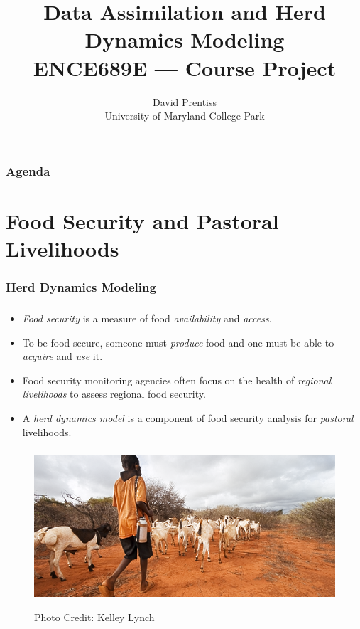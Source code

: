 \documentclass[mathserif]{beamer}
\begin{document}
\nobibliography*
\title{Data Assimilation and Herd Dynamics Modeling \\ ENCE689E --- Course Project}
\author{David Prentiss \\ University of Maryland College Park}

\frame{\titlepage}

\begin{frame}
  \frametitle{Agenda}
  \tableofcontents
\end{frame}

\section{Food Security and Pastoral Livelihoods}

\begin{frame}
  \frametitle{Herd Dynamics Modeling}
  \tableofcontents[currentsection]
\end{frame}

\begin{frame}
  \frametitle{\insertsection}
  \begin{itemize}
    \item \emph{Food security} is a measure of food \emph{availability} and \emph{access}.
    \item To be food secure, someone must \emph{produce} food and one must be able to \emph{acquire} and \emph{use} it.
    \item Food security monitoring agencies often focus on the health of \emph{regional livelihoods} to assess regional food security.
    \item A \emph{herd dynamics model} is a component of food security analysis for \emph{pastoral} livelihoods.
  \end{itemize}
\end{frame}

\begin{frame}
  \begin{figure}
    \begin{center}
      \frametitle{\insertsection}
      \includegraphics[width=1\textwidth]{image}

      Photo Credit: Kelley Lynch
    \end{center}
  \end{figure}
\end{frame}
\end{document}
